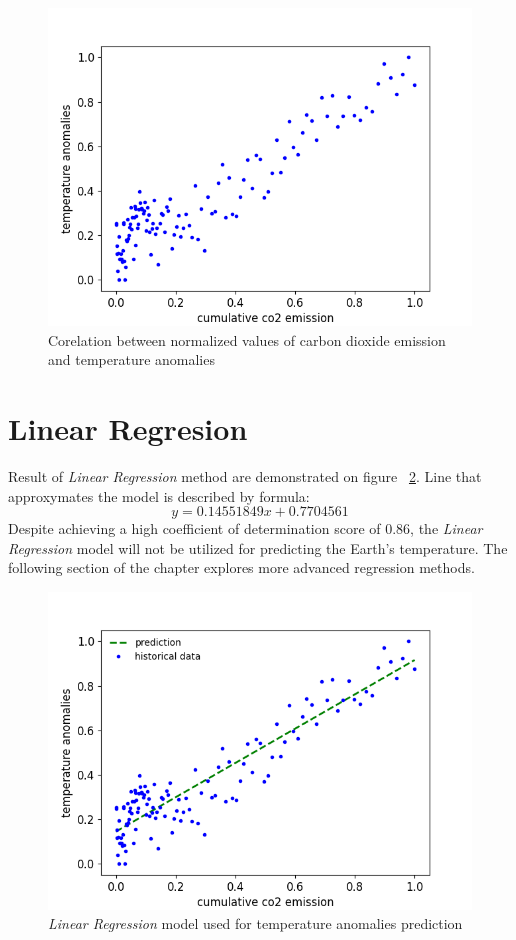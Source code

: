 \begin{figure}[H]
  \includegraphics[width=\linewidth]{img/cumulative-co2-temperature.png}
  \caption{Corelation between normalized values of carbon dioxide emission and temperature anomalies}
  \label{fig:cumulative-co2-temperature}
\end{figure}

\clearpage
\section{Linear Regresion}
Result of \textit{Linear Regression} method are demonstrated on figure ~\ref{fig:linear-regression}. Line that approxymates the model is described by formula:
\[ y = 0.14551849x + 0.7704561  \]
Despite achieving a high coefficient of determination score of 0.86, the \textit{Linear Regression} model will not be utilized for predicting the Earth's temperature.
The following section of the chapter explores more advanced regression methods.
\begin{figure}[h]
  \includegraphics[width=\linewidth]{img/linear-regression.png}
  \caption{\textit{Linear Regression} model used for temperature anomalies prediction }
  \label{fig:linear-regression}
\end{figure}

